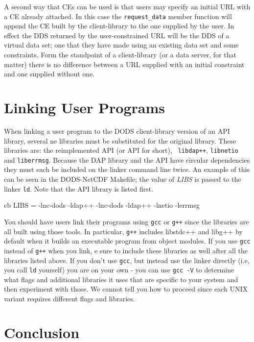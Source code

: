 A second way that CEs can be used is that users may specify an initial URL
with a CE already attached. In this case the {\tt request\_data} member
function will append the CE built by the client-library to the one supplied
by the user. In effect the DDS returned by the user-constrained URL will be
the DDS of a virtual data set; one that they have made using an existing data
set and some constraints. Form the standpoint of a client-library (or a data
server, for that matter) there is no difference between a URL supplied with
an initial constraint and one supplied without one.

\section{Linking User Programs}
\label{tk:linking}

When linking a user program to the DODS client-library version of an API
library, several ne libraries must be substituted for the original library.
These libraries are: the reimplemented API (or API for short), {\tt
  libdap++}, {\tt libnetio} and {\tt liberrmsg}. Because the DAP library and
the API have circular dependencies they must each be included on the linker
command line twice. An example of this can be seen in the DODS-NetCDF
Makefile; the value of {\em LIBS\/} is passed to the linker {\tt ld}. Note
that the API library is listed first.

\begin{code}{cb}
LIBS = -lnc-dods -ldap++ -lnc-dods -ldap++ -lnetio -lerrmsg 
\end{code}

You should have users link their programs using {\tt gcc} or {\tt g++} since
the libraries are all built using those tools. In particular, {\tt g++}
includes libstdc++ and libg++ by default when it builds an executable program
from object modules. If you use {\tt gcc} instead of {\tt g++} when you link,
e sure to include these libraries as well after all the libraries listed
above. If you don't use {\tt gcc}, but instead use the linker directly (i.e,
you call {\tt ld} yourself) you are on your own - you can use {\tt gcc -V} to
determine what flags and additional libraries it uses that are specific to your
system and then experiment with those. We cannot tell you how to proceed
since each UNIX variant requires different flags and libraries.

\section{Conclusion}

